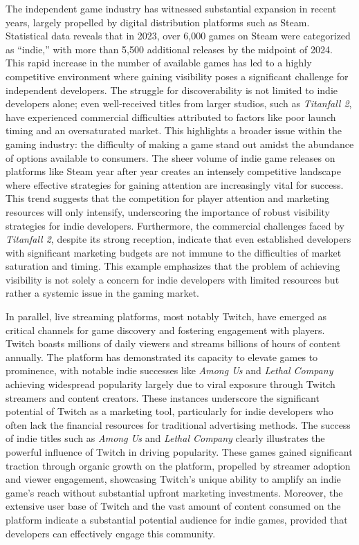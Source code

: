 \documentclass[conference]{IEEEtran}
\begin{document}
The independent game industry has witnessed substantial expansion in recent years, largely propelled by digital distribution platforms such as Steam. Statistical data reveals that in 2023, over 6,000 games on Steam were categorized as ``indie,'' with more than 5,500 additional releases by the midpoint of 2024. This rapid increase in the number of available games has led to a highly competitive environment where gaining visibility poses a significant challenge for independent developers. The struggle for discoverability is not limited to indie developers alone; even well-received titles from larger studios, such as \textit{Titanfall 2}, have experienced commercial difficulties attributed to factors like poor launch timing and an oversaturated market. This highlights a broader issue within the gaming industry: the difficulty of making a game stand out amidst the abundance of options available to consumers. The sheer volume of indie game releases on platforms like Steam year after year creates an intensely competitive landscape where effective strategies for gaining attention are increasingly vital for success. This trend suggests that the competition for player attention and marketing resources will only intensify, underscoring the importance of robust visibility strategies for indie developers. Furthermore, the commercial challenges faced by \textit{Titanfall 2}, despite its strong reception, indicate that even established developers with significant marketing budgets are not immune to the difficulties of market saturation and timing. This example emphasizes that the problem of achieving visibility is not solely a concern for indie developers with limited resources but rather a systemic issue in the gaming market.

In parallel, live streaming platforms, most notably Twitch, have emerged as critical channels for game discovery and fostering engagement with players. Twitch boasts millions of daily viewers and streams billions of hours of content annually. The platform has demonstrated its capacity to elevate games to prominence, with notable indie successes like \textit{Among Us} and \textit{Lethal Company} achieving widespread popularity largely due to viral exposure through Twitch streamers and content creators. These instances underscore the significant potential of Twitch as a marketing tool, particularly for indie developers who often lack the financial resources for traditional advertising methods. The success of indie titles such as \textit{Among Us} and \textit{Lethal Company} clearly illustrates the powerful influence of Twitch in driving popularity. These games gained significant traction through organic growth on the platform, propelled by streamer adoption and viewer engagement, showcasing Twitch's unique ability to amplify an indie game's reach without substantial upfront marketing investments. Moreover, the extensive user base of Twitch and the vast amount of content consumed on the platform indicate a substantial potential audience for indie games, provided that developers can effectively engage this community.
\end{document}
